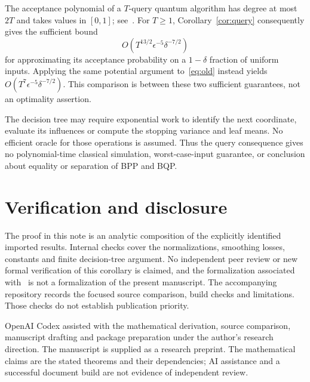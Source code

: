 \documentclass[11pt]{article}
\theoremstyle{remark}\newtheorem{remark}[theorem]{Remark}
\begin{document}
The acceptance polynomial of a $T$-query quantum algorithm has degree at most $2T$ and takes values in $[0,1]$; see~\cite{AA}. For $T\ge1$, Corollary~\ref{cor:query} consequently gives the sufficient bound
\[
 O\!\left(T^{13/2}\epsilon^{-5}\delta^{-7/2}\right)
\]
for approximating its acceptance probability on a $1-\delta$ fraction of uniform inputs. Applying the same potential argument to~\eqref{eq:old} instead yields $O(T^7\epsilon^{-5}\delta^{-7/2})$. This comparison is between these two sufficient guarantees, not an optimality assertion.

The decision tree may require exponential work to identify the next coordinate, evaluate its influences or compute the stopping variance and leaf means. No efficient oracle for those operations is assumed. Thus the query consequence gives no polynomial-time classical simulation, worst-case-input guarantee, or conclusion about equality or separation of BPP and BQP.

\section*{Verification and disclosure}
The proof in this note is an analytic composition of the explicitly identified imported results. Internal checks cover the normalizations, smoothing losses, constants and finite decision-tree argument. No independent peer review or new formal verification of this corollary is claimed, and the formalization associated with~\cite{T} is not a formalization of the present manuscript. The accompanying repository records the focused source comparison, build checks and limitations. Those checks do not establish publication priority.

OpenAI Codex assisted with the mathematical derivation, source comparison, manuscript drafting and package preparation under the author's research direction. The manuscript is supplied as a research preprint. The mathematical claims are the stated theorems and their dependencies; AI assistance and a successful document build are not evidence of independent review.
\end{document}
